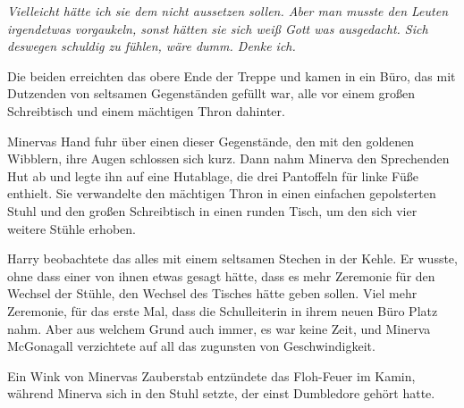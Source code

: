 \emph{Vielleicht hätte ich sie dem nicht aussetzen sollen. Aber man musste den Leuten \emph{irgendetwas} vorgaukeln, sonst hätten sie sich weiß Gott was ausgedacht. Sich deswegen schuldig zu fühlen, wäre dumm. Denke ich.}

Die beiden erreichten das obere Ende der Treppe und kamen in ein Büro, das mit Dutzenden von seltsamen Gegenständen gefüllt war, alle vor einem großen Schreibtisch und einem mächtigen Thron dahinter.

Minervas Hand fuhr über einen dieser Gegenstände, den mit den goldenen Wibblern, ihre Augen schlossen sich kurz. Dann nahm Minerva den Sprechenden Hut ab und legte ihn auf eine Hutablage, die drei Pantoffeln für linke Füße enthielt. Sie verwandelte den mächtigen Thron in einen einfachen gepolsterten Stuhl und den großen Schreibtisch in einen runden Tisch, um den sich vier weitere Stühle erhoben.

Harry beobachtete das alles mit einem seltsamen Stechen in der Kehle. Er wusste, ohne dass einer von ihnen etwas gesagt hätte, dass es mehr Zeremonie für den Wechsel der Stühle, den Wechsel des Tisches hätte geben sollen. Viel mehr Zeremonie, für das erste Mal, dass die Schulleiterin in ihrem neuen Büro Platz nahm. Aber aus welchem Grund auch immer, es war keine Zeit, und Minerva McGonagall verzichtete auf all das zugunsten von Geschwindigkeit.

Ein Wink von Minervas Zauberstab entzündete das Floh-Feuer im Kamin, während Minerva sich in den Stuhl setzte, der einst Dumbledore gehört hatte.

